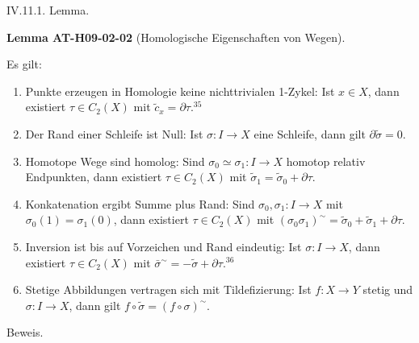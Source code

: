 \documentclass[10pt, letterpaper]{article}
\newcommand{\CustomHeading}[3]{%
  \par\medskip\noindent%
  \textbf{#1 #2} \textnormal{(#3)}.\enskip%
}
\newenvironment{LEM}[2]{\begin{unitbox}\CustomHeading{Lemma}{#1}{#2}}{\end{unitbox}}
\begin{document}
IV.11.1. Lemma. 

\begin{LEM}{AT-H09-02-02}{Homologische Eigenschaften von Wegen}
Es gilt:
\begin{enumerate}[label=(\roman*)]
    \item Punkte erzeugen in Homologie keine nichttrivialen 1-Zykel: Ist $x \in X$, dann existiert $\tau \in C_2(X)$ mit $\tilde{c}_x = \partial \tau$.${}^{35}$
    
    \item Der Rand einer Schleife ist Null: Ist $\sigma: I \rightarrow X$ eine Schleife, dann gilt $\partial \tilde{\sigma} = 0$.
    
    \item Homotope Wege sind homolog: Sind $\sigma_0 \simeq \sigma_1: I \rightarrow X$ homotop relativ Endpunkten, dann existiert $\tau \in C_2(X)$ mit $\tilde{\sigma}_1 = \tilde{\sigma}_0 + \partial \tau$.
    
    \item Konkatenation ergibt Summe plus Rand: Sind $\sigma_0, \sigma_1: I \rightarrow X$ mit $\sigma_0(1) = \sigma_1(0)$, dann existiert $\tau \in C_2(X)$ mit $\left( \sigma_0 \sigma_1 \right)^{\sim} = \tilde{\sigma}_0 + \tilde{\sigma}_1 + \partial \tau$.
    
    \item Inversion ist bis auf Vorzeichen und Rand eindeutig: Ist $\sigma: I \rightarrow X$, dann existiert $\tau \in C_2(X)$ mit $\bar{\sigma}^{\sim} = -\tilde{\sigma} + \partial \tau$.${}^{36}$
    
    \item Stetige Abbildungen vertragen sich mit Tildefizierung: Ist $f: X \rightarrow Y$ stetig und $\sigma: I \rightarrow X$, dann gilt $f \circ \tilde{\sigma} = (f \circ \sigma)^{\sim}$.
\end{enumerate}
\end{LEM}
  

Beweis. 
\end{document}
